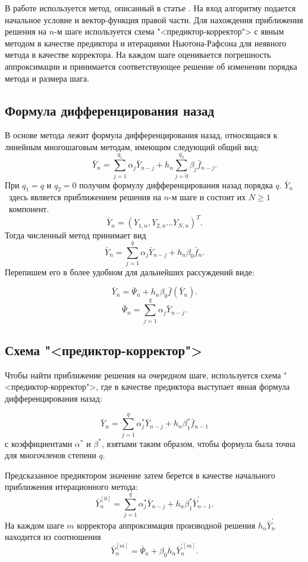 \documentclass[oneside,final,14pt]{extreport}
\begin{document}
В работе используется метод, описанный в статье \cite{lsode}. На вход алгоритму подается начальное условие и вектор-функция правой части.      Для нахождения приближения решения на \(n\)-м шаге используется схема "<предиктор-корректор"> с явным методом в качестве предиктора и итерациями Ньютона-Рафсона для неявного метода в качестве корректора. На каждом шаге оценивается погрешность аппроксимации и принимается соответствующее решение об изменении порядка метода и размера шага.

\subsection{Формула дифференцирования назад}
В основе метода лежит формула дифференцирования назад, относящаяся к 
линейным многошаговым методам, имеющим следующий общий вид:
\[\bar Y_n=\sum_{j=1}^{q_1} \alpha_j\bar Y_{n-j}+h_n\sum_{j=0}^{q_2} \beta_j\bar f_{n-j}.\]
При \(q_1=q\) и \(q_2=0\) получим формулу дифференцирования назад порядка \(q\). \(\bar Y_n\)~здесь является приближением решения на \(n\)-м шаге и состоит их \(N \ge 1\)~компонент.
\[\bar Y_n=(Y_{1,n},Y_{2,n}\ldots Y_{N,n})^T.\]
Тогда численный метод принимает вид
\[\bar Y_n=\sum_{j=1}^{q} \alpha_j\bar Y_{n-j}+h_n\beta_0\bar f_{n}.\]
Перепишем его в более удобном для дальнейших рассуждений виде:

\begin{equation}
\label{bdf}
	\bar Y_n=\bar\Psi_n+h_n\beta_0\bar f(\bar Y_n).
\end{equation}
\begin{equation}
\label{psi}
	\bar \Psi_n=\sum_{j=1}^{q} \alpha_j\bar Y_{n-j}.
\end{equation}

\subsection{Схема "<предиктор-корректор">}
Чтобы найти приближение решения на очередном шаге, используется схема "<предиктор-корректор">, где в качестве предиктора выступает явная формула дифференцирования назад:

\[\bar Y_n=\sum_{j=1}^{q} \alpha_j^*\bar Y_{n-j}+h_n\beta_1^*\bar f_{n-1}\]
с коэффициентами \(\alpha^*\) и \(\beta^*\), взятыми таким образом, чтобы формула была точна для многочленов степени \(q\).

Предсказанное предиктором значение затем берется в качестве начального приближения итерационного метода:
\[\bar Y_n^{[0]}=\sum_{j=1}^{q} \alpha_j^*\bar Y_{n-j}+h_n\beta_1^*\bar Y_{n-1}^{'}.\]
 На каждом шаге \(m\) корректора аппроксимация производной решения \(h_n\bar Y_n^{'}\) находится из соотношения
\begin{equation}
\bar Y_n^{[m]}=\bar\Psi_n+\beta_0 h_n\bar Y_n^{'[m]}.
\end{equation}
\end{document}
